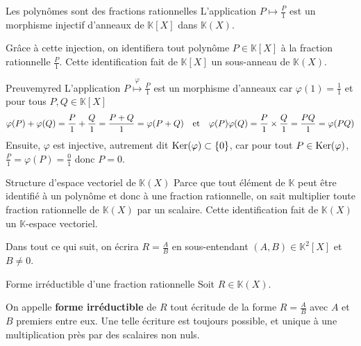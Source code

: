     \begin{theo}{Les polynômes sont des fractions rationnelles}{}
        L’application $P \mapsto \frac{P}{1}$ est un morphisme injectif d’anneaux de $\mathbb{K}[X]$ dans $\mathbb{K}(X)$.

        Grâce à cette injection, on identifiera tout polynôme $P \in \mathbb{K}[X]$ à la fraction rationnelle $\frac{P}{1}$. Cette identification fait de $\mathbb{K}[X]$ un sous-anneau de $\mathbb{K}(X)$.
    \end{theo}

    \begin{demo}{Preuve}{myred}
        L’application $P \overset{\varphi}{\longmapsto} \frac{P}{1}$ est un morphisme d’anneaux car $\varphi(1) = \frac{1}{1}$ et pour tous $P,Q \in \mathbb{K}[X]$ 
        \[ \varphi(P) + \varphi(Q) = \frac{P}{1} + \frac{Q}{1} = \frac{P + Q}{1} = \varphi(P + Q) \quad \text{et} \quad \varphi(P)\varphi(Q) = \frac{P}{1} \times \frac{Q}{1} = \frac{PQ}{1} = \varphi(PQ) \]
        Ensuite, $\varphi$ est injective, autrement dit $\operatorname{Ker}(\varphi) \subset \{0\}$, car pour tout $P \in \operatorname{Ker}(\varphi)$, $\frac{P}{1} = \varphi(P) = \frac{0}{1}$ donc $P = 0$.
    \end{demo}

    \begin{theo}{Structure d’espace vectoriel de $\mathbb{K}(X)$}{}
        Parce que tout élément de $\mathbb{K}$ peut être identifié à un polynôme et donc à une fraction rationnelle, on sait multiplier toute fraction rationnelle de $\mathbb{K}(X)$ par un scalaire. Cette identification fait de $\mathbb{K}(X)$ un $\mathbb{K}$-espace vectoriel.
    \end{theo}

    Dans tout ce qui suit, on écrira $R = \frac{A}{B}$ en sous-entendant $(A,B) \in \mathbb{K}^2[X]$ et $B \neq 0$.

    \begin{defi}{Forme irréductible d’une fraction rationnelle}{}
        Soit $R \in \mathbb{K}(X)$. 

        On appelle \textbf{forme irréductible} de $R$ tout écritude de la forme $R = \frac{A}{B}$ avec $A$ et $B$ premiers entre eux. Une telle écriture est toujours possible, et unique à une multiplication près par des scalaires non nuls.
    \end{defi}

